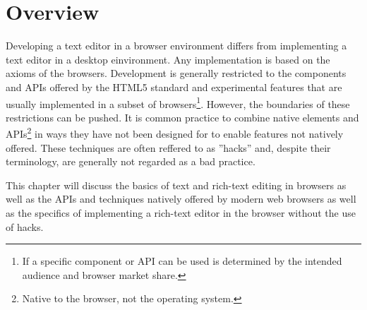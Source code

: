 
\section{Overview}

Developing a text editor in a browser environment differs from implementing a text editor in a desktop einvironment. Any implementation is based on the axioms of the browsers. Development is generally restricted to the components and APIs offered by the HTML5 standard and experimental features that are usually implemented in a subset of browsers\footnote{If a specific component or API can be used is determined by the intended audience and browser market share.}. However, the boundaries of these restrictions can be pushed. It is common practice to combine native elements and APIs\footnote{Native to the browser, not the operating system.} in ways they have not been designed for to enable features not natively offered. These techniques are often reffered to as ''hacks'' and, despite their terminology, are generally not regarded as a bad practice.

This chapter will discuss the basics of text and rich-text editing in browsers as well as the APIs and techniques natively offered by modern web browsers as well as the specifics of implementing a rich-text editor in the browser without the use of hacks.


